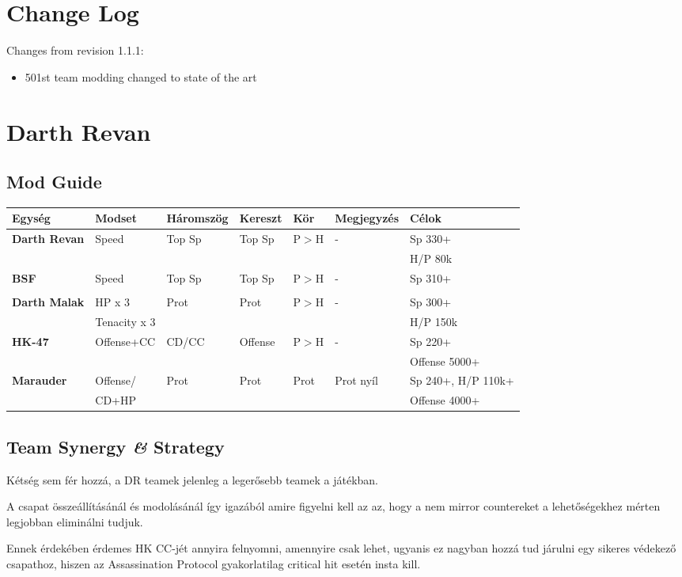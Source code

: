 \documentclass[11pt]{report}
\begin{document}

\chapter{Change Log}
Changes from revision 1.1.1:
\begin{itemize}
    \item 501st team modding changed to state of the art
\end{itemize}


\chapter{Darth Revan}
\section{Mod Guide}
\begin{center}
    \begin{tabular}{|l | l | l | l | l | l | l |}
        \hline
        Egység & Modset & Háromszög & Kereszt & Kör & Megjegyzés & Célok\\ \hline
        \textbf{Darth Revan} & Speed & Top Sp & Top Sp & P$>$H & - & Sp 330+\\ 
        &  &  &  &  &  & H/P 80k\\ \hline
        \textbf{BSF} & Speed & Top Sp & Top Sp & P$>$H & - & Sp 310+\\
        &  &  &  &  &  & \\ \hline
        \textbf{Darth Malak} & HP x 3 & Prot & Prot & P$>$H & - & Sp 300+\\
        & Tenacity x 3 &  &  &  &  & H/P 150k\\ \hline
        \textbf{HK-47} & Offense+CC & CD/CC & Offense & P$>$H & - & Sp 220+\\
        &  &  &  &  &  & Offense 5000+\\ \hline
        \textbf{Marauder} & Offense/ & Prot & Prot & Prot & Prot nyíl & Sp 240+, H/P 110k+\\
        & CD+HP &  &  &  &  & Offense 4000+\\ \hline
    \end{tabular}
\end{center}
\section{Team Synergy \textit{\&} Strategy}
Kétség sem fér hozzá, a DR teamek jelenleg a legerősebb teamek a játékban. \par
A csapat összeállításánál és modolásánál így igazából amire figyelni kell az az, hogy a nem mirror countereket a lehetőségekhez mérten legjobban eliminálni tudjuk.\par
Ennek érdekében érdemes HK CC-jét annyira felnyomni, amennyire csak lehet, ugyanis ez nagyban hozzá tud járulni egy sikeres védekező csapathoz, hiszen az Assassination Protocol gyakorlatilag critical hit esetén insta kill. 
\end{document}
